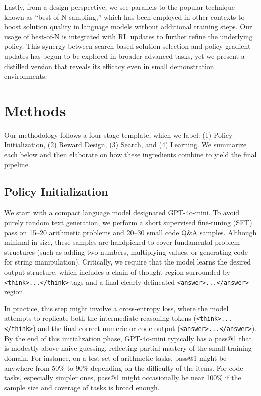 \documentclass{article}
\begin{document}
Lastly, from a design perspective, we see parallels to the popular technique known as “best-of-N sampling,” which has been employed in other contexts to boost solution quality in language models without additional training steps. Our usage of best-of-N is integrated with RL updates to further refine the underlying policy. This synergy between search-based solution selection and policy gradient updates has begun to be explored in broader advanced tasks, yet we present a distilled version that reveals its efficacy even in small demonstration environments.

\section{Methods}
Our methodology follows a four-stage template, which we label: (1) Policy Initialization, (2) Reward Design, (3) Search, and (4) Learning. We summarize each below and then elaborate on how these ingredients combine to yield the final pipeline.

\subsection{Policy Initialization}
We start with a compact language model designated GPT-4o-mini. To avoid purely random text generation, we perform a short supervised fine-tuning (SFT) pass on 15–20 arithmetic problems and 20–30 small code Q\&A samples. Although minimal in size, these samples are handpicked to cover fundamental problem structures (such as adding two numbers, multiplying values, or generating code for string manipulation). Critically, we require that the model learns the desired output structure, which includes a chain-of-thought region surrounded by \texttt{<think>...</think>} tags and a final clearly delineated \texttt{<answer>...</answer>} region.

In practice, this step might involve a cross-entropy loss, where the model attempts to replicate both the intermediate reasoning tokens (\texttt{<think>...</think>}) and the final correct numeric or code output (\texttt{<answer>...</answer>}). By the end of this initialization phase, GPT-4o-mini typically has a pass@1 that is modestly above naive guessing, reflecting partial mastery of the small training domain. For instance, on a test set of arithmetic tasks, pass@1 might be anywhere from 50\% to 90\% depending on the difficulty of the items. For code tasks, especially simpler ones, pass@1 might occasionally be near 100\% if the sample size and coverage of tasks is broad enough.
\end{document}
